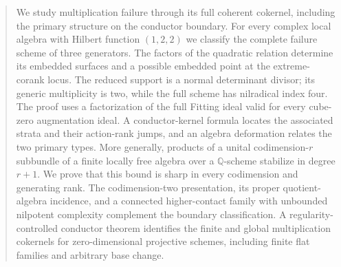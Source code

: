 \begin{abstract}
We study multiplication failure through its full coherent cokernel,
including the primary structure on the conductor boundary. For every
complex local algebra with Hilbert function $(1,2,2)$ we classify the
complete failure scheme of three generators. The factors of the
quadratic relation determine its embedded surfaces and a possible
embedded point at the extreme-corank locus. The reduced support is
a normal determinant divisor; its generic multiplicity is two, while
the full scheme has nilradical index four. The proof uses a factorization
of the full Fitting ideal valid for every cube-zero augmentation ideal.
A conductor-kernel formula locates the associated strata and their
action-rank jumps, and an algebra deformation relates the two primary
types. More generally, products of a unital codimension-$r$ subbundle
of a finite locally free algebra over a $\mathbb Q$-scheme stabilize
in degree $r+1$. We prove that this bound is sharp in every codimension
and generating rank. The codimension-two presentation, its proper
quotient-algebra incidence, and a connected higher-contact family with
unbounded nilpotent complexity complement the boundary classification.
A regularity-controlled conductor theorem identifies the finite and
global multiplication cokernels for zero-dimensional projective schemes,
including finite flat families and arbitrary base change.
\end{abstract}
\maketitle
